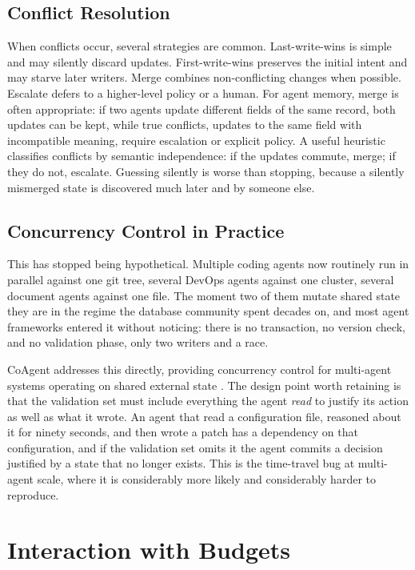 \documentclass[11pt]{book}
\begin{document}
\subsection{Conflict Resolution}

When conflicts occur, several strategies are common. Last-write-wins is simple and may silently discard updates. First-write-wins preserves the initial intent and may starve later writers. Merge combines non-conflicting changes when possible. Escalate defers to a higher-level policy or a human. For agent memory, merge is often appropriate: if two agents update different fields of the same record, both updates can be kept, while true conflicts, updates to the same field with incompatible meaning, require escalation or explicit policy. A useful heuristic classifies conflicts by semantic independence: if the updates commute, merge; if they do not, escalate. Guessing silently is worse than stopping, because a silently mismerged state is discovered much later and by someone else.

\subsection{Concurrency Control in Practice}

This has stopped being hypothetical. Multiple coding agents now routinely run in parallel against one git tree, several DevOps agents against one cluster, several document agents against one file. The moment two of them mutate shared state they are in the regime the database community spent decades on, and most agent frameworks entered it without noticing: there is no transaction, no version check, and no validation phase, only two writers and a race.

CoAgent addresses this directly, providing concurrency control for multi-agent systems operating on shared external state \cite{coagent2026}. The design point worth retaining is that the validation set must include everything the agent \textit{read} to justify its action as well as what it wrote. An agent that read a configuration file, reasoned about it for ninety seconds, and then wrote a patch has a dependency on that configuration, and if the validation set omits it the agent commits a decision justified by a state that no longer exists. This is the time-travel bug at multi-agent scale, where it is considerably more likely and considerably harder to reproduce.

\section{Interaction with Budgets}
\end{document}
